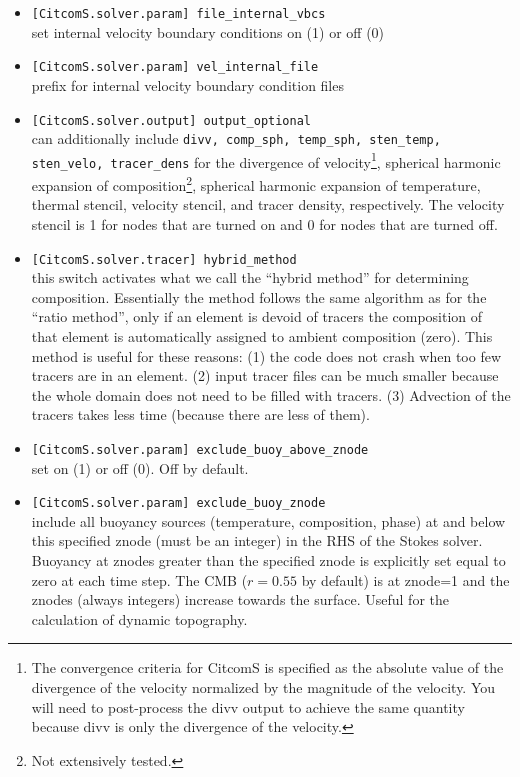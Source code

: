 \documentclass[letterpaper,12pt]{article}
\begin{document}
\begin{itemize}
\begin{enumerate}
\end{enumerate}
\item \verb#[CitcomS.solver.param] file_internal_vbcs#\\ set internal velocity boundary conditions on (1) or off (0)
\item \verb#[CitcomS.solver.param] vel_internal_file#\\ prefix for internal velocity boundary condition files
\item \verb#[CitcomS.solver.output] output_optional#\\ can additionally include \verb#divv, comp_sph, temp_sph, sten_temp, sten_velo, tracer_dens# for the divergence of velocity\footnote{The convergence criteria for CitcomS is specified as the absolute value of the divergence of the velocity normalized by the magnitude of the velocity.  You will need to post-process the divv output to achieve the same quantity because divv is only the divergence of the velocity.}, spherical harmonic expansion of composition\footnote{Not extensively tested.}, spherical harmonic expansion of temperature, thermal stencil, velocity stencil, and tracer density, respectively.  The velocity stencil is 1 for nodes that are turned on and 0 for nodes that are turned off.
\item \verb#[CitcomS.solver.tracer] hybrid_method#\\ this switch activates what we call the ``hybrid method'' for determining composition.  Essentially the method follows the same algorithm as for the ``ratio method'', only if an element is devoid of tracers the composition of that element is automatically assigned to ambient composition (zero).  This method is useful for these reasons: (1) the code does not crash when too few tracers are in an element.  (2) input tracer files can be much smaller because the whole domain does not need to be filled with tracers.  (3) Advection of the tracers takes less time (because there are less of them).
\item \verb#[CitcomS.solver.param] exclude_buoy_above_znode#\\ set on (1) or off (0).  Off by default.
\item \verb#[CitcomS.solver.param] exclude_buoy_znode#\\ include all buoyancy sources (temperature, composition, phase) at and below this specified znode (must be an integer) in the RHS of the Stokes solver.  Buoyancy at znodes greater than the specified znode is explicitly set equal to zero at each time step.  The CMB ($r=0.55$ by default) is at znode=1 and the znodes (always integers) increase towards the surface.  Useful for the calculation of dynamic topography.
\end{itemize}
\end{document}
